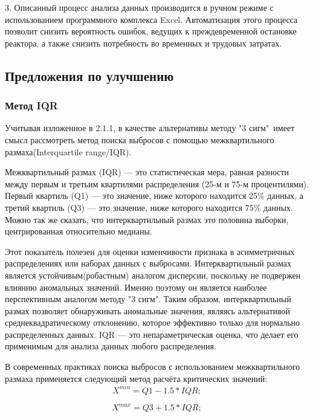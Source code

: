 3. Описанный процесс анализа данных производится в ручном режиме с использованием программного комплекса Excel. Автоматизация этого процесса позволит снизить вероятность ошибок, ведущих к преждевременной остановке реактора, а также снизить потребность во временных и трудовых затратах.

\subsection{Предложения по улучшению}

\subsubsection{Метод IQR}

Учитывая изложенное в 2.1.1, в качестве альтернативы методу "3 сигм"\ имеет смысл рассмотреть метод поиска выбросов с помощью межквартильного размаха(Interquartile range/IQR).

Межквартильный размах (IQR) — это статистическая мера, равная разности между первым и третьим квартилями распределения (25-м и 75-м процентилями). Первый квартиль (Q1) — это значение, ниже которого находится 25\% данных, а третий квартиль (Q3) — это значение, ниже которого находится 75\% данных. Можно так же сказать, что интерквартильный размах это половина выборки, центрированная относительно медианы. 

Этот показатель полезен для оценки изменчивости признака в асимметричных распределениях или наборах данных с выбросами. Интерквартильный размах является устойчивым(робастным) аналогом дисперсии, поскольку не подвержен влиянию аномальных значений. Именно поэтому он является наиболее перспективным аналогом методу "3 сигм". 
Таким образом, интерквартильный размах позволяет обнаруживать аномальные значения, являясь альтернативой среднеквадратическому отклонению, которое эффективно только для нормально распределенных данных. IQR — это непараметрическая оценка, что делает его применимым для анализа данных любого распределения.

В современных практиках поиска выбросов с использованием межквартильного размаха применяется следующий метод расчёта критических значений:
\begin{equation} \label{eq:IQRmin}
	X^{min}  = Q1-1.5*IQR;
\end{equation}

\begin{equation} \label{eq:IQRmax}
	X^{max}  = Q3+1.5*IQR;
\end{equation}


